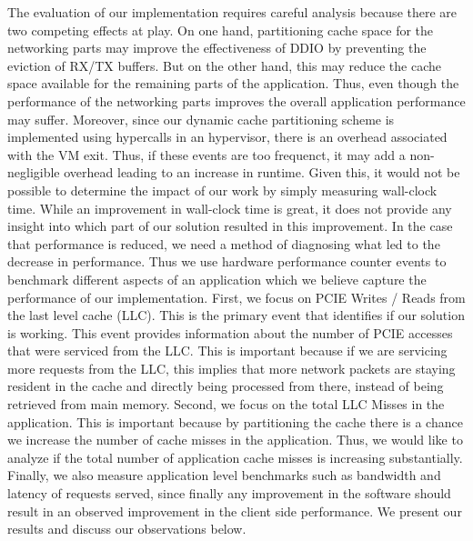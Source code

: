 \documentclass[sigconf,authorversion,noacm]{acmart}
\begin{document}
The evaluation of our implementation requires careful analysis because there are
two competing effects at play. On one hand, partitioning cache space for the
networking parts may improve the effectiveness of DDIO by preventing the
eviction of RX/TX buffers. But on the other hand, this may reduce the cache
space available for the remaining parts of the application. Thus, even though
the performance of the networking parts improves the overall application
performance may suffer. Moreover, since our dynamic cache partitioning scheme is
implemented using hypercalls in an hypervisor, there is an overhead associated
with the VM exit. Thus, if these events are too frequenct, it may add a
non-negligible overhead leading to an increase in runtime. Given this, it would
not be possible to determine the impact of our work by simply measuring
wall-clock time. While an improvement in wall-clock time is great, it does not
provide any insight into which part of our solution resulted in this
improvement. In the case that performance is reduced, we need a method of
diagnosing what led to the decrease in performance. Thus we use hardware
performance counter events to benchmark different aspects of an application
which we believe capture the performance of our implementation. First, we focus
on PCIE Writes / Reads from the last level cache (LLC). This is the primary
event that identifies if our solution is working. This event provides
information about the number of PCIE accesses that were serviced from the LLC.
This is important because if we are servicing more requests from the LLC, this
implies that more network packets are staying resident in the cache and directly
being processed from there, instead of being retrieved from main memory. Second,
we focus on the total LLC Misses in the application. This is important because
by partitioning the cache there is a chance we increase the number of cache
misses in the application. Thus, we would like to analyze if the total number of
application cache misses is increasing substantially. Finally, we also measure
application level benchmarks such as bandwidth and latency of requests served,
since finally any improvement in the software should result in an observed
improvement in the client side performance. We present our results and discuss
our observations below.
\end{document}
